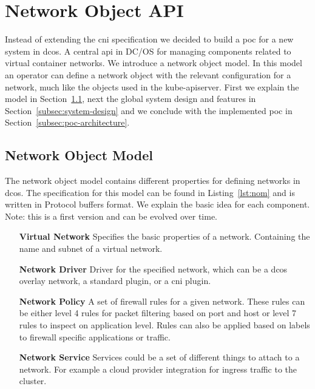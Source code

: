 \section{Network Object API}
\label{sec:networkobject-api}
Instead of extending the \gls{cni} specification we decided to build a \gls{poc} for a new system in \gls{dcos}. A central \gls{api} in DC/OS for managing components related to virtual container networks. We introduce a network object model. In this model an operator can define a network object with the relevant configuration for a network, much like the objects used in the kube-apiserver. First we explain the model in Section~\ref{subsec:network-object-model}, next the global system design and features in Section~\ref{subsec:system-design} and we conclude with the implemented \gls{poc} in Section~\ref{subsec:poc-architecture}.

\subsection{Network Object Model}
\label{subsec:network-object-model}
The network object model contains different properties for defining networks in \gls{dcos}. The specification for this model can be found in Listing~\ref{lst:nom} and is written in Protocol buffers format. We explain the basic idea for each component. Note: this is a first version and can be evolved over time.



\begin{itemize}
    \item[\textbf{Virtual Network}] Specifies the basic properties of a network. Containing the name and subnet of a virtual network.
    \item[\textbf{Network Driver}] Driver for the specified network, which can be  a \gls{dcos} overlay network, a standard plugin, or a \gls{cni} plugin.
    \item[\textbf{Network Policy}] A set of firewall rules for a given network. These rules can be either level 4 rules for packet filtering based on port and host or level 7 rules to inspect on application level. Rules can also be applied based on labels to firewall specific applications or traffic.
    \item[\textbf{Network Service}] Services could be a set of different things to attach to a network. For example a cloud provider integration for ingress traffic to the cluster.
\end{itemize}

